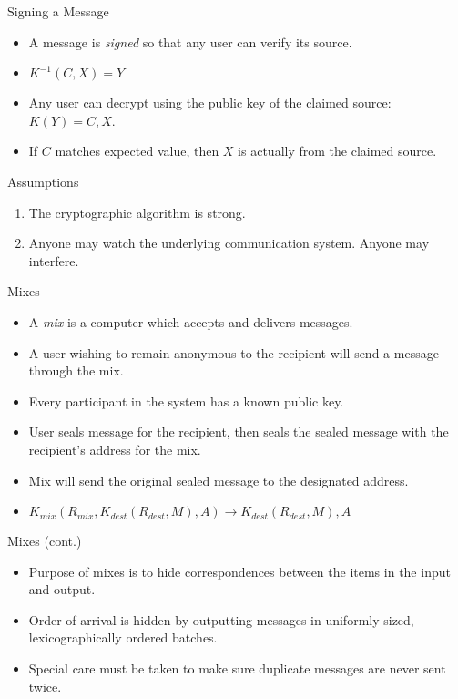 \documentclass[default,pdf,colorBG,slideColor]{prosper}
\begin{document}
\begin{slide}{Signing a Message}
\begin{itemize}
\item A message is \emph{signed} so that any user can verify its source.
\item $K^{-1}(C, X)=Y$
\item Any user can decrypt using the public key of the claimed source: $K(Y)=C, X$.
\item If $C$ matches expected value, then $X$ is actually from the claimed source.
\end{itemize}
\end{slide}

\begin{slide}{Assumptions}
\begin{enumerate}
\item The cryptographic algorithm is strong.
\item Anyone may watch the underlying communication system.  Anyone may interfere.
\end{enumerate}
\end{slide}

\begin{slide}{Mixes}
\begin{itemize}
\item A \emph{mix} is a computer which accepts and delivers messages.
\item A user wishing to remain anonymous to the recipient will send a message through the mix.
\item Every participant in the system has a known public key.
\item User seals message for the recipient, then seals the sealed message with the recipient's address for the mix.
\item Mix will send the original sealed message to the designated address.
\item $K_{mix}(R_{mix}, K_{dest}(R_{dest}, M), A)\rightarrow K_{dest}(R_{dest}, M), A$
\end{itemize}
\end{slide}

\begin{slide}{Mixes (cont.)}
\begin{itemize}
\item Purpose of mixes is to hide correspondences between the items in the input and output.
\item Order of arrival is hidden by outputting messages in uniformly sized, lexicographically ordered batches.
\item Special care must be taken to make sure duplicate messages are never sent twice.
\end{itemize}
\end{slide}
\end{document}

